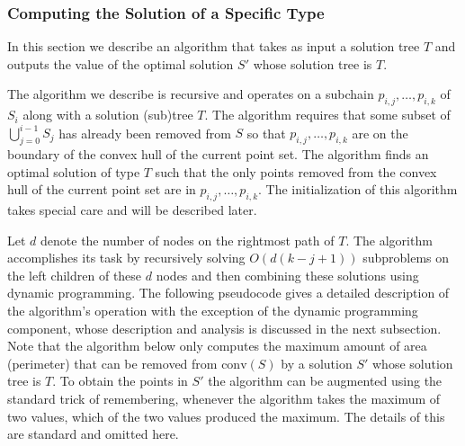 \documentclass{elsart}
\newcommand{\ch}{\mathrm{conv}}
\begin{document}


\subsubsection{Computing the Solution of a Specific Type}

In this section we describe an algorithm that takes as input a
solution tree $T$ and outputs the value of the optimal solution $S'$
whose solution tree is $T$.

The algorithm we describe is recursive and operates on a subchain
$p_{i,j},\ldots,p_{i,k}$ of $S_i$ along with a solution (sub)tree $T$.  The
algorithm requires that some subset of $\bigcup_{j=0}^{i-1}S_j$ has
already been removed from $S$ so that $p_{i,j},\ldots,p_{i,k}$ are on
the boundary of the convex hull of the current point set.  The
algorithm finds an optimal solution of type $T$ such that the only
points removed from the convex hull of the current point set are in
$p_{i,j},\ldots,p_{i,k}$.  The initialization of this algorithm takes
special care and will be described later.

Let $d$ denote the number of nodes on the rightmost path of $T$.  The
algorithm accomplishes its task by recursively solving $O(d(k-j+1))$
subproblems on the left children of these $d$ nodes and then combining
these solutions using dynamic programming.  The following pseudocode
gives a detailed description of the algorithm's operation with the
exception of the dynamic programming component, whose description and
analysis is discussed in the next subsection.  Note that the algorithm
below only computes the maximum amount of area (perimeter) that can be
removed from $\ch(S)$ by a solution $S'$ whose solution tree is $T$.  To
obtain the points in $S'$ the algorithm can be augmented using
the standard trick of remembering, whenever the algorithm takes the
maximum of two values, which of the two values produced the maximum.
The details of this are standard and omitted here.
\end{document}
